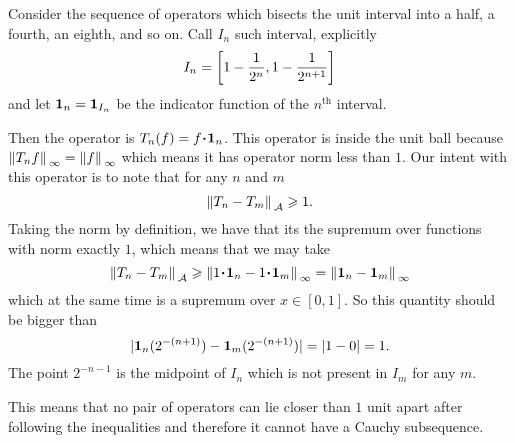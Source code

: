 \documentclass[12pt]{memoir}
\begin{document}
\begin{ptcbr}
    Consider the sequence of operators which bisects the unit interval into a half, a fourth, an eighth, and so on. Call $I_n$ such interval, explicitly
    $$I_n=\left\lbrack1-\frac{1}{2^n},1-\frac{1}{2^{n+1}}\right\rbrack$$
    and let $\mathbf{1}_n=\mathbf{1}_{I_n}$ be the indicator function of the $n^{\text{th}}$ interval.\par 
    Then the operator is $T_n(f)=f\.\ind_n$. This operator is inside the unit ball because $\norm*{T_nf}_\infty=\norm*{f}_\infty$ which means it has operator norm less than $1$. Our intent with this operator is to note that for any $n$ and $m$
    $$\norm*{T_n-T_m}_{\mathcal{A}}\geqslant 1.$$
    Taking the norm by definition, we have that its the supremum over functions with norm exactly $1$, which means that we may take 
    $$\norm*{T_n-T_m}_\cA\geq\norm*{1\.\ind_n-1\.\ind_m}_{\infty}=\norm*{\ind_n-\ind_m}_{\infty}$$
    which at the same time is a supremum over $x\in[0,1]$. So this quantity should be bigger than 
    $$|\mathbf{1}_n(2^{-(n+1)})-\mathbf{1}_m(2^{-(n+1)})|=|1-0|=1.$$
    The point $2^{-n-1}$ is the midpoint of $I_n$ which is not present in $I_m$ for any $m$.\par 
    This means that no pair of operators can lie closer than $1$ unit apart after following the inequalities and therefore it cannot have a Cauchy subsequence.
\end{ptcbr}
\end{document}
